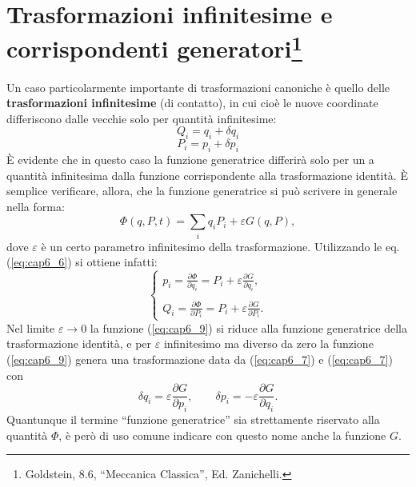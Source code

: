\documentclass[a4paper,12pt,oneside]{book}
\begin{document}
\section[Trasformazioni infinitesime e corrispondenti generatori]{Trasformazioni infinitesime e corrispondenti generatori\footnote{Goldstein, 8.6,  ``Meccanica Classica'', Ed. Zanichelli.}}
Un caso particolarmente importante di trasformazioni canoniche è quello delle \textbf{trasformazioni infinitesime} (di contatto), in cui cioè le nuove coordinate differiscono dalle vecchie solo per quantità infinitesime:
\begin{equation}
Q_i = q_i + \delta q _i \label{eq:cap6_7}
\end{equation}
\begin{equation}
P_i = p_i + \delta p _i \label{eq:cap6_8} 
\end{equation}
È evidente che in questo caso la funzione generatrice differirà solo per un a quantità infinitesima dalla funzione corrispondente alla trasformazione identità. È semplice verificare, allora, che la funzione generatrice si può scrivere in generale nella forma:
\begin{equation}
\Phi(q, P, t) = \sum _i q_iP_i +\varepsilon G(q, P) ,
\label{eq:cap6_9}
\end{equation}
dove $\varepsilon $ è un certo parametro infinitesimo della trasformazione. Utilizzando le eq. (\ref{eq:cap6_6}) si ottiene infatti:
\begin{equation}
\begin{cases}
\displaystyle{p_i= \frac{\partial \Phi}{\partial q_i} = P_i + \varepsilon \frac{\partial G}{\partial q_i }, }\\
\\
\displaystyle{Q_i= \frac{\partial \Phi}{\partial P_i} = P_i + \varepsilon \frac{\partial G}{\partial P_i }.}
\end{cases}
\end{equation}
Nel limite $\varepsilon \rightarrow 0$ la funzione (\ref{eq:cap6_9}) si riduce alla funzione generatrice della trasformazione identità, e per $\varepsilon$ infinitesimo ma diverso da zero la funzione (\ref{eq:cap6_9}) genera una trasformazione data da (\ref{eq:cap6_7}) e (\ref{eq:cap6_7}) con
\begin{equation}
\delta q_i = \varepsilon \frac{\partial G}{\partial p_i },\qquad \delta p _i = -\varepsilon \frac{\partial G}{\partial q_i } .
\label{eq:cap6_11}
\end{equation}
Quantunque il termine  ``funzione generatrice''  sia strettamente riservato alla quantità $\Phi$, è però di uso comune indicare con questo nome anche la funzione $G$.\\
\end{document}
